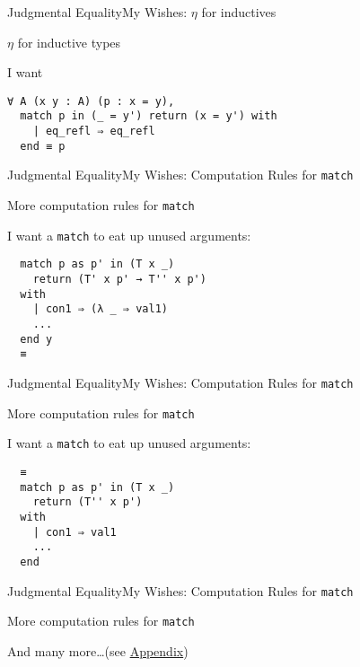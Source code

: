 \documentclass{beamer}
\begin{document}
\begin{frame}[fragile]{Judgmental Equality}{My Wishes: \texorpdfstring{$\eta$}{η} for inductives}
  \Large
  \begin{center}
    $\eta$ for inductive types
  \end{center}
  I want
\begin{verbatim}
∀ A (x y : A) (p : x = y),
  match p in (_ = y') return (x = y') with
    | eq_refl ⇒ eq_refl
  end ≡ p

\end{verbatim}
\end{frame}

\begin{frame}[fragile]{Judgmental Equality}{My Wishes: Computation Rules for \texorpdfstring{\texttt{match}}{match}}
  \Large
  \begin{center}
    More computation rules for \texttt{match}
  \end{center}
  I want a \texttt{match} to eat up unused arguments:
\begin{verbatim}
  match p as p' in (T x _)
    return (T' x p' → T'' x p')
  with
    | con1 ⇒ (λ _ ⇒ val1)
    ...
  end y
  ≡
\end{verbatim}
\end{frame}


\begin{frame}[fragile]{Judgmental Equality}{My Wishes: Computation Rules for \texorpdfstring{\texttt{match}}{match}}
  \Large
  \begin{center}
    More computation rules for \texttt{match}
  \end{center}
  I want a \texttt{match} to eat up unused arguments:
\begin{verbatim}
  ≡
  match p as p' in (T x _)
    return (T'' x p')
  with
    | con1 ⇒ val1
    ...
  end
\end{verbatim}
\end{frame}

\begin{frame}{Judgmental Equality}{My Wishes: Computation Rules for \texorpdfstring{\texttt{match}}{match}}
  \Large
  \begin{center}
    More computation rules for \texttt{match}
  \end{center}
  And many more\ldots (see \hyperref[sec:more-match]{Appendix})
\end{frame}
\end{document}
